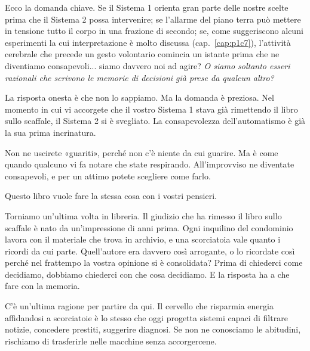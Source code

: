 Ecco la domanda chiave. Se il Sistema 1 orienta gran parte delle nostre scelte prima che il Sistema 2 possa intervenire; se l'allarme del piano terra può mettere in tensione tutto il corpo in una frazione di secondo; se, come suggeriscono alcuni esperimenti la cui interpretazione è molto discussa (cap.~\ref{cap:p1c7}), l'attività cerebrale che precede un gesto volontario comincia un istante prima che ne diventiamo consapevoli... siamo davvero noi ad agire? \textit{O siamo soltanto esseri razionali che scrivono le memorie di decisioni già prese da qualcun altro?}

La risposta onesta è che non lo sappiamo. Ma la domanda è preziosa. Nel momento in cui vi accorgete che il vostro Sistema 1 stava già rimettendo il libro sullo scaffale, il Sistema 2 si è svegliato. La consapevolezza dell'automatismo è già la sua prima incrinatura.

Non ne uscirete «guariti», perché non c'è niente da cui guarire. Ma è come quando qualcuno vi fa notare che state respirando. All'improvviso ne diventate consapevoli, e per un attimo potete scegliere come farlo.

Questo libro vuole fare la stessa cosa con i vostri pensieri.

Torniamo un'ultima volta in libreria. Il giudizio che ha rimesso il libro sullo scaffale è nato da un'impressione di anni prima. Ogni inquilino del condominio lavora con il materiale che trova in archivio, e una scorciatoia vale quanto i ricordi da cui parte. Quell'autore era davvero così arrogante, o lo ricordate così perché nel frattempo la vostra opinione si è consolidata? Prima di chiederci come decidiamo, dobbiamo chiederci con che cosa decidiamo. E la risposta ha a che fare con la memoria.

C'è un'ultima ragione per partire da qui. Il cervello che risparmia energia affidandosi a scorciatoie è lo stesso che oggi progetta sistemi capaci di filtrare notizie, concedere prestiti, suggerire diagnosi. Se non ne conosciamo le abitudini, rischiamo di trasferirle nelle macchine senza accorgercene.
